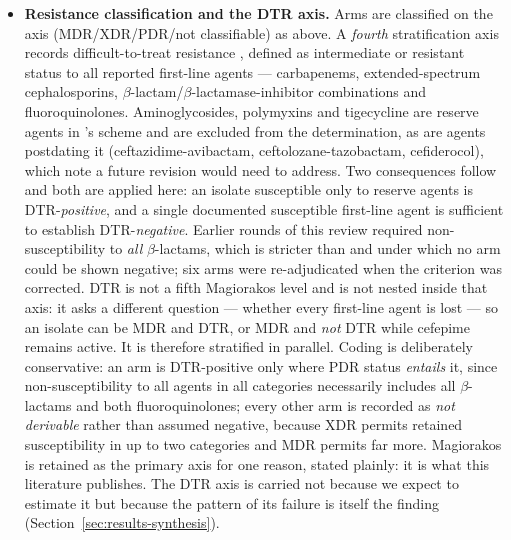 \begin{itemize}
\item \textbf{Resistance classification and the DTR axis.} Arms are classified on the \textcite{Magiorakos2012_mdrxdr} axis (MDR/XDR/PDR/not classifiable) as above. A \emph{fourth} stratification axis records difficult-to-treat resistance \parencite{Kadri2018_dtr}, defined as intermediate or resistant status to all reported first-line agents --- carbapenems, extended-spectrum cephalosporins, $\beta$-lactam/$\beta$-lactamase-inhibitor combinations and fluoroquinolones. Aminoglycosides, polymyxins and tigecycline are reserve agents in \citeauthor{Kadri2018_dtr}'s scheme and are excluded from the determination, as are agents postdating it (ceftazidime-avibactam, ceftolozane-tazobactam, cefiderocol), which \citeauthor{Kadri2018_dtr} note a future revision would need to address. Two consequences follow and both are applied here: an isolate susceptible only to reserve agents is DTR-\emph{positive}, and a single documented susceptible first-line agent is sufficient to establish DTR-\emph{negative}. Earlier rounds of this review required non-susceptibility to \emph{all} $\beta$-lactams, which is stricter than \citeauthor{Kadri2018_dtr} and under which no arm could be shown negative; six arms were re-adjudicated when the criterion was corrected. DTR is not a fifth Magiorakos level and is not nested inside that axis: it asks a different question --- whether every first-line agent is lost --- so an isolate can be MDR and DTR, or MDR and \emph{not} DTR while cefepime remains active. It is therefore stratified in parallel. Coding is deliberately conservative: an arm is DTR-positive only where PDR status \emph{entails} it, since non-susceptibility to all agents in all categories necessarily includes all $\beta$-lactams and both fluoroquinolones; every other arm is recorded as \emph{not derivable} rather than assumed negative, because XDR permits retained susceptibility in up to two categories and MDR permits far more. Magiorakos is retained as the primary axis for one reason, stated plainly: it is what this literature publishes. The DTR axis is carried not because we expect to estimate it but because the pattern of its failure is itself the finding (Section~\ref{sec:results-synthesis}).

\end{itemize}
